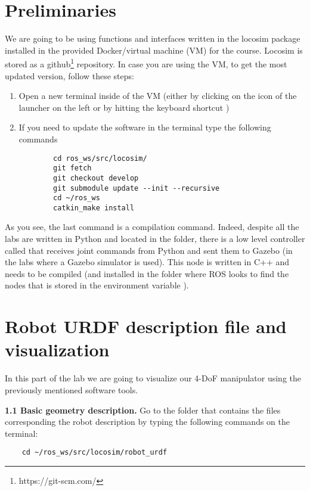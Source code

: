 \documentclass[11pt]{article}
\begin{document}
%
\section{Preliminaries}
We are going to be using functions and interfaces written in the locosim package installed in the provided Docker/virtual machine (VM) for the course. Locosim is stored as a github\footnote{https://git-scm.com/} repository. In case you are using the VM, to get the most updated version, follow these steps:

\begin{enumerate}
	\item Open a new terminal inside of the VM (either by clicking on the icon of the launcher on the left or by hitting the keyboard shortcut )
	\item If you need to update the software in the terminal type the following commands
	
	\begin{verbatim}
		cd ros_ws/src/locosim/
		git fetch 
		git checkout develop
		git submodule update --init --recursive
		cd ~/ros_ws
		catkin_make install
	\end{verbatim}

\end{enumerate}

As you see, the last command is a compilation command. Indeed, despite all the labs are written in Python and located in the  folder, there is a low level controller called  that receives joint commands from Python and sent them to Gazebo (in the labs where a Gazebo simulator is used). This node is written in C++ and needs to be compiled (and installed in the folder where ROS looks to find the nodes that is stored in the environment variable  ). 
%
\section{Robot URDF description file and visualization}
%
In this part of the lab we are going to visualize our 4-DoF manipulator using the previously mentioned software tools.

\textbf{1.1 Basic geometry description.} Go to the folder that contains the files corresponding the robot description by typing the following commands on the terminal:


\begin{verbatim}
	cd ~/ros_ws/src/locosim/robot_urdf
\end{verbatim}
\end{document}
